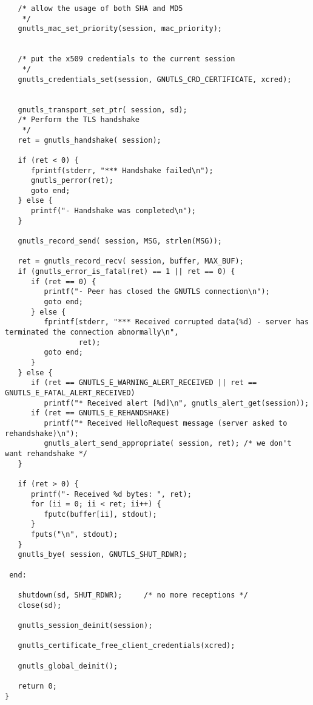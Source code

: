 \begin{verbatim}
   /* allow the usage of both SHA and MD5
    */
   gnutls_mac_set_priority(session, mac_priority);


   /* put the x509 credentials to the current session
    */
   gnutls_credentials_set(session, GNUTLS_CRD_CERTIFICATE, xcred);


   gnutls_transport_set_ptr( session, sd);
   /* Perform the TLS handshake
    */
   ret = gnutls_handshake( session);

   if (ret < 0) {
      fprintf(stderr, "*** Handshake failed\n");
      gnutls_perror(ret);
      goto end;
   } else {
      printf("- Handshake was completed\n");
   }

   gnutls_record_send( session, MSG, strlen(MSG));

   ret = gnutls_record_recv( session, buffer, MAX_BUF);
   if (gnutls_error_is_fatal(ret) == 1 || ret == 0) {
      if (ret == 0) {
         printf("- Peer has closed the GNUTLS connection\n");
         goto end;
      } else {
         fprintf(stderr, "*** Received corrupted data(%d) - server has terminated the connection abnormally\n",
                 ret);
         goto end;
      }
   } else {
      if (ret == GNUTLS_E_WARNING_ALERT_RECEIVED || ret == GNUTLS_E_FATAL_ALERT_RECEIVED)
         printf("* Received alert [%d]\n", gnutls_alert_get(session));
      if (ret == GNUTLS_E_REHANDSHAKE)
         printf("* Received HelloRequest message (server asked to rehandshake)\n");
         gnutls_alert_send_appropriate( session, ret); /* we don't want rehandshake */
   }

   if (ret > 0) {
      printf("- Received %d bytes: ", ret);
      for (ii = 0; ii < ret; ii++) {
         fputc(buffer[ii], stdout);
      }
      fputs("\n", stdout);
   }
   gnutls_bye( session, GNUTLS_SHUT_RDWR);

 end:

   shutdown(sd, SHUT_RDWR);     /* no more receptions */
   close(sd);

   gnutls_session_deinit(session);

   gnutls_certificate_free_client_credentials(xcred);

   gnutls_global_deinit();

   return 0;
}

\end{verbatim}
